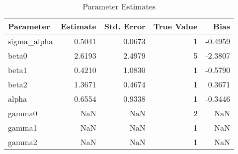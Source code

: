 \begin{table}
\caption{Parameter Estimates}
\begin{tabular}{lrrrr}
\toprule
Parameter & Estimate & Std. Error & True Value & Bias \\
\midrule
sigma_alpha & 0.5041 & 0.0673 & 1 & -0.4959 \\
beta0 & 2.6193 & 2.4979 & 5 & -2.3807 \\
beta1 & 0.4210 & 1.0830 & 1 & -0.5790 \\
beta2 & 1.3671 & 0.4674 & 1 & 0.3671 \\
alpha & 0.6554 & 0.9338 & 1 & -0.3446 \\
gamma0 & NaN & NaN & 2 & NaN \\
gamma1 & NaN & NaN & 1 & NaN \\
gamma2 & NaN & NaN & 1 & NaN \\
\bottomrule
\end{tabular}
\end{table}
